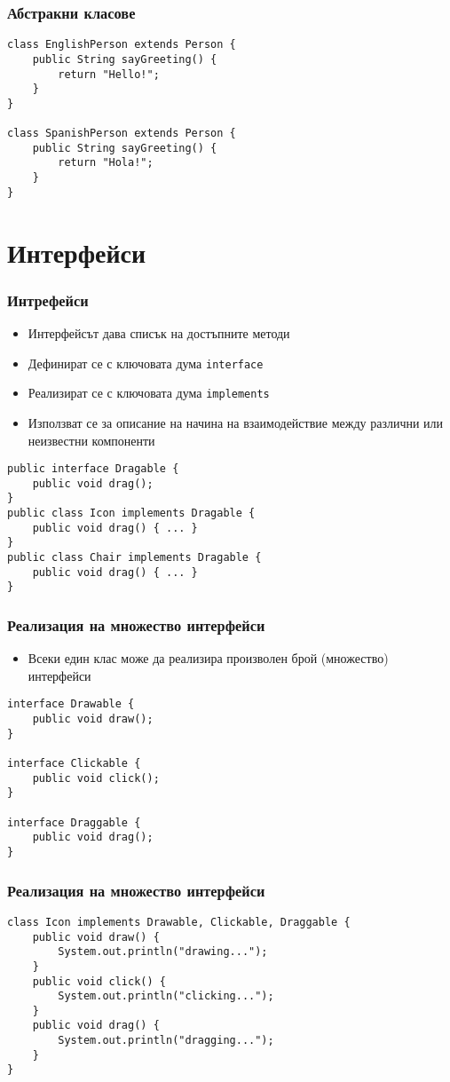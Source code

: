 \documentclass[ignorenonframetext, hyperref=unicode,compress,pdflatex]{beamer}
\begin{document}
\begin{frame}[containsverbatim]\frametitle{Абстракни класове}
\begin{lstlisting}
class EnglishPerson extends Person { 
 	public String sayGreeting() {
 		return "Hello!";
	}
}

class SpanishPerson extends Person { 
 	public String sayGreeting() {
 		return "Hola!";
	}
}
\end{lstlisting}
\end{frame}


\section{Интерфейси}

\begin{frame}[containsverbatim]\frametitle{Интрефейси}
\begin{itemize}
\item Интерфейсът дава списък на достъпните методи
\item Дефинират се с ключовата дума \lstinline{interface}
\item Реализират се с ключовата дума \lstinline{implements}
\item Използват се за описание на начина на взаимодействие между различни или неизвестни компоненти
\end{itemize}
\begin{lstlisting}
public interface Dragable { 
 	public void drag();
}
public class Icon implements Dragable { 
 	public void drag() { ... }
}
public class Chair implements Dragable {
 	public void drag() { ... }
}
\end{lstlisting}
\end{frame}

\begin{frame}[containsverbatim]\frametitle{Реализация на множество интерфейси}
\begin{itemize}
\item Всеки един клас може да реализира произволен брой (множество) интерфейси
\end{itemize}
\begin{lstlisting}
interface Drawable {
 	public void draw();
}

interface Clickable {
 	public void click();
}

interface Draggable {
 	public void drag();
}
\end{lstlisting}
\end{frame}


\begin{frame}[containsverbatim]\frametitle{Реализация на множество интерфейси}
\begin{lstlisting}
class Icon implements Drawable, Clickable, Draggable {
 	public void draw() {
 		System.out.println("drawing...");
	}
 	public void click() {
 		System.out.println("clicking...");
	}
 	public void drag() {
 		System.out.println("dragging...");
	}
}
\end{lstlisting}
\end{frame}
\end{document}
